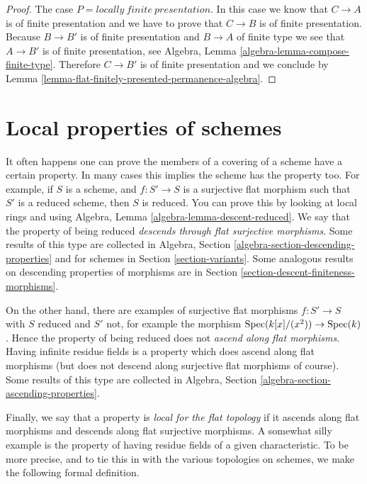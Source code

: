\begin{proof}
\medskip\noindent
The case $P = locally\ finite\ presentation$.
In this case we know that $C \to A$ is of finite presentation and
we have to prove that $C \to B$ is of finite presentation.
Because $B \to B'$ is of finite presentation and $B \to A$
of finite type we see that $A \to B'$ is of finite presentation, see
Algebra, Lemma \ref{algebra-lemma-compose-finite-type}.
Therefore $C \to B'$ is of finite presentation and we conclude by
Lemma \ref{lemma-flat-finitely-presented-permanence-algebra}.
\end{proof}










\section{Local properties of schemes}
\label{section-descending-properties}

\noindent
It often happens one can prove the members of a covering of a scheme
have a certain property. In many cases this implies the scheme has the
property too. For example, if $S$ is a scheme, and $f : S' \to S$
is a surjective flat morphism such that $S'$ is a reduced scheme, then $S$ is
reduced. You can prove this by looking at local rings and using
Algebra, Lemma \ref{algebra-lemma-descent-reduced}.
We say that the property of being reduced
{\it descends through flat surjective morphisms}.
Some results of this type are collected in
Algebra, Section \ref{algebra-section-descending-properties} and
for schemes in Section \ref{section-variants}.
Some analogous results on descending properties
of morphisms are in Section \ref{section-descent-finiteness-morphisms}.

\medskip\noindent
On the other hand, there are examples of surjective flat morphisms
$f : S' \to S$ with $S$ reduced and $S'$ not, for example the morphism
$\mathop{\mathrm{Spec}}(k[x]/(x^2)) \to \mathop{\mathrm{Spec}}(k)$. Hence the property of
being reduced does not {\it ascend along flat morphisms}. Having infinite
residue fields is a property which does ascend along flat morphisms (but
does not descend along surjective flat morphisms of course). Some results
of this type are collected in
Algebra, Section \ref{algebra-section-ascending-properties}.

\medskip\noindent
Finally, we say that a property is {\it local for the flat topology}
if it ascends along flat morphisms and descends along flat surjective
morphisms. A somewhat silly example is the property of having residue
fields of a given characteristic. To be more precise, and to tie this in
with the various topologies on schemes, we make the following
formal definition.

